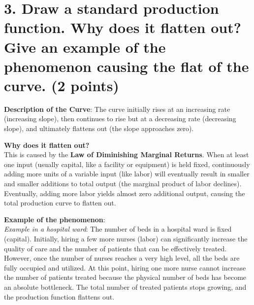 \documentclass[11pt, letterpaper]{article}
\begin{document}
\section*{3. Draw a standard production function. Why does it flatten out? Give an example of the phenomenon causing the flat of the curve. (2 points)}

\begin{center}
\end{center}

\textbf{Description of the Curve}: The curve initially rises at an increasing rate (increasing slope), then continues to rise but at a decreasing rate (decreasing slope), and ultimately flattens out (the slope approaches zero).

\textbf{Why does it flatten out?} \\
This is caused by the \textbf{Law of Diminishing Marginal Returns}. When at least one input (usually capital, like a facility or equipment) is held fixed, continuously adding more units of a variable input (like labor) will eventually result in smaller and smaller additions to total output (the marginal product of labor declines). Eventually, adding more labor yields almost zero additional output, causing the total production curve to flatten out.

\textbf{Example of the phenomenon}: \\
\textit{Example in a hospital ward}: The number of beds in a hospital ward is fixed (capital). Initially, hiring a few more nurses (labor) can significantly increase the quality of care and the number of patients that can be effectively treated. However, once the number of nurses reaches a very high level, all the beds are fully occupied and utilized. At this point, hiring one more nurse cannot increase the number of patients treated because the physical number of beds has become an absolute bottleneck. The total number of treated patients stops growing, and the production function flattens out.
\end{document}
